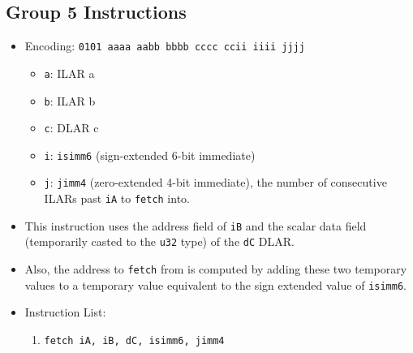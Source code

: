 \documentclass{article}
\begin{document}
	\subsection{Group 5 Instructions}
		\begin{itemize}
		\item Encoding: \texttt{0101 aaaa aabb bbbb  cccc ccii iiii jjjj}
			\begin{itemize}
			\item \texttt{a}: ILAR a
			\item \texttt{b}: ILAR b
			\item \texttt{c}: DLAR c
			\item \texttt{i}: \texttt{isimm6} (sign-extended 6-bit
				immediate)
			\item \texttt{j}: \texttt{jimm4} (zero-extended 4-bit
				immediate), the number of consecutive ILARs past
				\texttt{iA} to \texttt{fetch} into.
			\end{itemize}

		\item This instruction uses the address field of \texttt{iB} and
			the scalar data field (temporarily casted to the \texttt{u32}
			type) of the \texttt{dC} DLAR.
		\item Also, the address to \texttt{fetch} from is computed by
			adding these two temporary values to a temporary value
			equivalent to the sign extended value of \texttt{isimm6}.

		\item Instruction List:
			\begin{enumerate}
			\item \texttt{fetch iA, iB, dC, isimm6, jimm4}
			\end{enumerate}
		\end{itemize}
		\newpage
\end{document}

